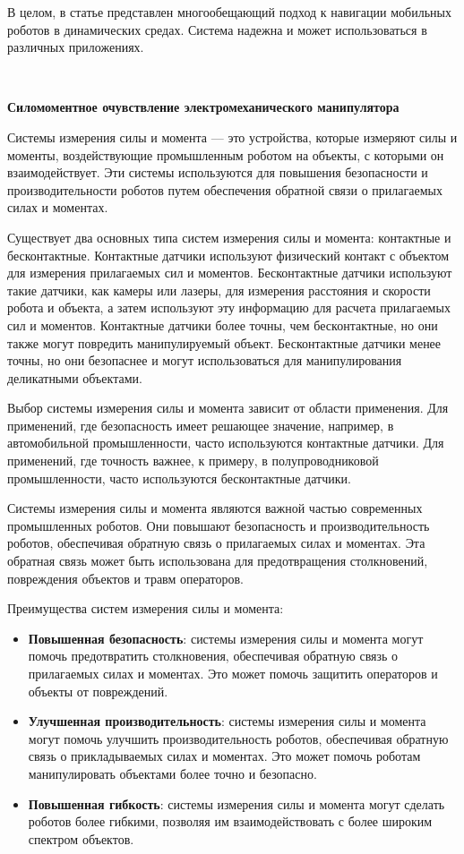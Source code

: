 \documentclass[russian,11pt]{article}
\providecommand{\header}[1]{
\,
\begin{center}
{\Large \textbf{#1}}
\end{center}
}
\begin{document}
В целом, в статье представлен многообещающий подход к навигации мобильных роботов в динамических средах. Система надежна и может использоваться в различных приложениях.

\pagebreak

\header{Силомоментное очувствление электромеханического манипулятора \cite{5}}

Системы измерения силы и момента --- это устройства, которые измеряют силы и моменты, воздействующие промышленным роботом на объекты, с которыми он взаимодействует. Эти системы используются для повышения безопасности и производительности роботов путем обеспечения обратной связи о прилагаемых силах и моментах.

Существует два основных типа систем измерения силы и момента: контактные и бесконтактные. Контактные датчики используют физический контакт с объектом для измерения прилагаемых сил и моментов. Бесконтактные датчики используют такие датчики, как камеры или лазеры, для измерения расстояния и скорости робота и объекта, а затем используют эту информацию для расчета прилагаемых сил и моментов.
Контактные датчики более точны, чем бесконтактные, но они также могут повредить манипулируемый объект. Бесконтактные датчики менее точны, но они безопаснее и могут использоваться для манипулирования деликатными объектами.

Выбор системы измерения силы и момента зависит от области применения. Для применений, где безопасность имеет решающее значение, например, в автомобильной промышленности, часто используются контактные датчики. Для применений, где точность важнее, к примеру, в полупроводниковой промышленности, часто используются бесконтактные датчики.

Системы измерения силы и момента являются важной частью современных промышленных роботов. Они повышают безопасность и производительность роботов, обеспечивая обратную связь о прилагаемых силах и моментах. Эта обратная связь может быть использована для предотвращения столкновений, повреждения объектов и травм операторов.

Преимущества систем измерения силы и момента:
\begin{itemize}
\item \textbf{Повышенная безопасность}: системы измерения силы и момента могут помочь предотвратить столкновения, обеспечивая обратную связь о прилагаемых силах и моментах. Это может помочь защитить операторов и объекты от повреждений.
\item \textbf{Улучшенная производительность}: системы измерения силы и момента могут помочь улучшить производительность роботов, обеспечивая обратную связь о прикладываемых силах и моментах. Это может помочь роботам манипулировать объектами более точно и безопасно.
\item \textbf{Повышенная гибкость}: системы измерения силы и момента могут сделать роботов более гибкими, позволяя им взаимодействовать с более широким спектром объектов.
\end{itemize}
\end{document}
